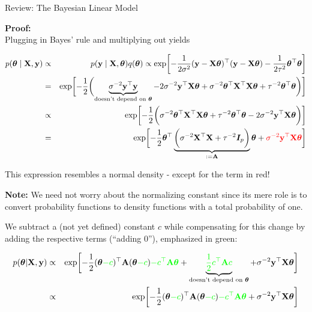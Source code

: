 \begin{frame}[c, allowframebreaks]{Review: The Bayesian Linear Model}
\begin{footnotesize}
\vspace{+.2cm}
\textbf{Proof:}\\
Plugging in Bayes' rule and multiplying out yields

\vspace{-.5cm}

\begin{eqnarray*}
p(\bm{\theta} \mid \mathbf{X}, \mathbf{y}) &\propto& p(\mathbf{y} \mid \mathbf{X}, \bm{\theta}) q(\bm{\theta}) \propto \exp\biggl[-\frac{1}{2\sigma^2}(\mathbf{y} - \mathbf{X}\bm{\theta})^\top(\mathbf{y} - \mathbf{X}\bm{\theta})-\frac{1}{2\tau^2}\bm{\theta}^\top\bm{\theta}\biggr] \\
&=& \exp\biggl[-\frac{1}{2}\biggl(\underbrace{\sigma^{-2}\mathbf{y}^\top\mathbf{y}}_{\text{doesn't depend on } \bm{\theta}} - 2 \sigma^{-2} \mathbf{y}^\top \mathbf{X} \bm{\theta} + \sigma^{-2}\bm{\theta}^\top \mathbf{X}^\top \mathbf{X} \bm{\theta}  + \tau^{-2} \bm{\theta}^\top\bm{\theta} \biggr)\biggr] \\
&\propto& \exp\biggl[-\frac{1}{2}\biggl(\sigma^{-2}\bm{\theta}^\top \mathbf{X}^\top \mathbf{X} \bm{\theta}  + \tau^{-2} \bm{\theta}^\top\bm{\theta}  - 2 \sigma^{-2} \mathbf{y}^\top \mathbf{X} \bm{\theta} \biggr)\biggr] \\
&=& \exp\biggl[-\frac{1}{2}\bm{\theta}^\top\underbrace{\biggl(\sigma^{-2} \mathbf{X}^\top \mathbf{X} + \tau^{-2} \boldsymbol{I}_p \biggr)}_{:= \mathbf{A}} \bm{\theta} + \textcolor{red}{\sigma^{-2} \mathbf{y}^\top \mathbf{X} \bm{\theta}}\biggr]
\end{eqnarray*}

This expression resembles a normal density - except for the term in red!




\framebreak

\textbf{Note:} We need not worry about the normalizing constant since its mere role is to convert probability functions to density functions with a total probability of one.

\vspace{+.2cm}

We subtract a (not yet defined) constant $c$ while compensating for this change by adding the respective terms (``adding $0$''), emphasized in green:

\vspace{-.5cm}

\begin{eqnarray*}
	p(\bm{\theta} | \mathbf{X}, \mathbf{y}) &\propto&  \exp\biggl[-\frac{1}{2}(\bm{\theta} \textcolor{green}{- c})^\top\mathbf{A}  (\bm{\theta} \textcolor{green}{- c}) \textcolor{green}{- c^\top \mathbf{A} \bm{\theta}} + \underbrace{\textcolor{green}{\frac{1}{2}c^\top\mathbf{A} c}}_{\text{doesn't depend on } \bm{\theta}} +\sigma^{-2} \mathbf{y}^\top \mathbf{X} \bm{\theta}\biggr] \\
	&\propto& \exp\biggl[-\frac{1}{2}(\bm{\theta} \textcolor{green}{- c})^\top\mathbf{A}  (\bm{\theta} \textcolor{green}{- c}) \textcolor{green}{- c^\top \mathbf{A} \bm{\theta}} +\sigma^{-2} \mathbf{y}^\top \mathbf{X} \bm{\theta}\biggr]
\end{eqnarray*}


\end{footnotesize}
\end{frame}
